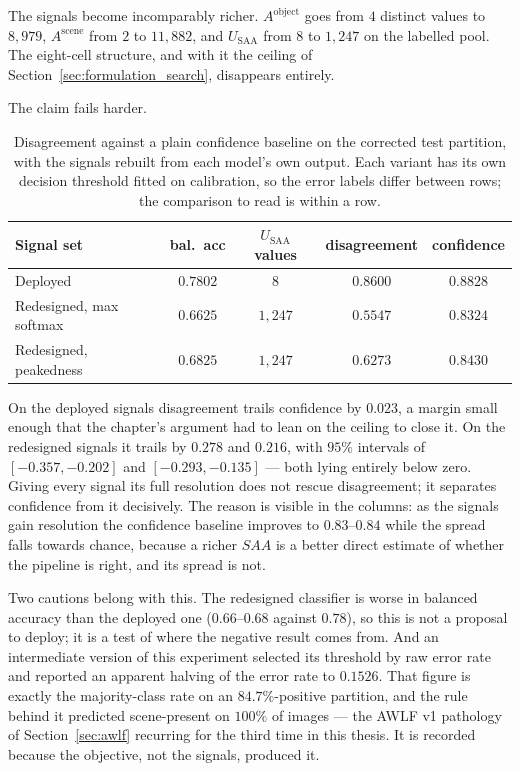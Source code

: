 \documentclass[12pt,a4paper]{report}
\begin{document}
\begin{enumerate}
The signals become incomparably richer. $A^{\text{object}}$ goes from $4$ distinct values to
$8{,}979$, $A^{\text{scene}}$ from $2$ to $11{,}882$, and $U_{\text{SAA}}$ from $8$ to $1{,}247$ on
the labelled pool. The eight-cell structure, and with it the ceiling of
Section~\ref{sec:formulation_search}, disappears entirely.

The claim fails harder.

\begin{table}[!htbp]
\centering
\caption[Disagreement against confidence on redesigned signals]{Disagreement against a plain confidence baseline on the corrected test partition, with the signals rebuilt from each model's own output. Each variant has its own decision threshold fitted on calibration, so the error labels differ between rows; the comparison to read is within a row.}
\label{tab:redesigned_signals}
\small
\begin{tabular}{@{}l c c c c@{}}
\toprule
\textbf{Signal set} & \textbf{bal.\ acc} & \textbf{$U_{\text{SAA}}$ values} & \textbf{disagreement} & \textbf{confidence} \\
\midrule
Deployed & $0.7802$ & $8$ & $0.8600$ & $0.8828$ \\
Redesigned, max softmax & $0.6625$ & $1{,}247$ & $0.5547$ & $\mathbf{0.8324}$ \\
Redesigned, peakedness & $0.6825$ & $1{,}247$ & $0.6273$ & $\mathbf{0.8430}$ \\
\bottomrule
\end{tabular}
\end{table}

On the deployed signals disagreement trails confidence by $0.023$, a margin small enough that the
chapter's argument had to lean on the ceiling to close it. On the redesigned signals it trails by
$\mathbf{0.278}$ and $\mathbf{0.216}$, with $95\%$ intervals of $[-0.357, -0.202]$ and
$[-0.293, -0.135]$ --- both lying entirely below zero. Giving every signal its full resolution does
not rescue disagreement; it separates confidence from it decisively. The reason is visible in the
columns: as the signals gain resolution the confidence baseline improves to $0.83$--$0.84$ while
the spread falls towards chance, because a richer $SAA$ is a better direct estimate of whether the
pipeline is right, and its spread is not.

Two cautions belong with this. The redesigned classifier is worse in balanced accuracy than the
deployed one ($0.66$--$0.68$ against $0.78$), so this is not a proposal to deploy; it is a test of
where the negative result comes from. And an intermediate version of this experiment selected its
threshold by raw error rate and reported an apparent halving of the error rate to $0.1526$. That
figure is exactly the majority-class rate on an $84.7\%$-positive partition, and the rule behind it
predicted scene-present on $100\%$ of images --- the AWLF v1 pathology of Section~\ref{sec:awlf}
recurring for the third time in this thesis. It is recorded because the objective, not the signals,
produced it.


\end{enumerate}
\end{document}
